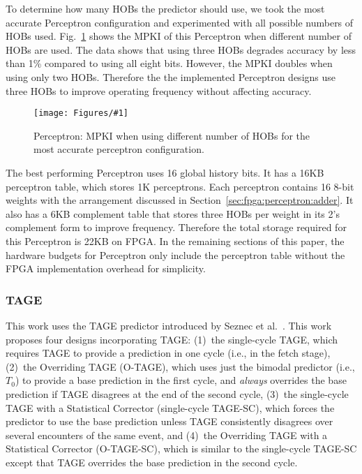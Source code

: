\documentclass[conference]{IEEEtran}
\newcommand{\kfig}[4]{ %
        \begin{figure}[!t]
        \centering
        \texttt{[image: Figures/\#1]}
        \vspace{-1mm}
        \caption{#3}
        \label{#2}
        \end{figure}
}
\begin{document}
To determine how many HOBs the predictor should use, we took the most accurate Perceptron configuration and experimented with all possible numbers of HOBs used. Fig.~\ref{fig:perceptronHOB} shows the MPKI of this Perceptron when different number of HOBs are used. The data shows that using three HOBs degrades accuracy by less than 1\% compared to using all eight bits. However, the MPKI doubles when using only two HOBs. Therefore the the implemented Perceptron designs use three HOBs to improve operating frequency without affecting accuracy.
\kfig{perceptronHOB.pdf}{fig:perceptronHOB}{Perceptron: MPKI when using different number of HOBs for the most accurate perceptron configuration.}{angle = 0, trim = 1in 2.6in 1in 2.6in, clip, width=0.35\textwidth}

The best performing Perceptron uses 16 global history bits. It has a 16KB perceptron table, which stores 1K perceptrons. Each perceptron contains 16 8-bit weights with the arrangement discussed in Section~\ref{sec:fpga:perceptron:adder}. It also has a 6KB complement table that stores three HOBs per weight in its 2's complement form to improve frequency. Therefore the total storage required for this Perceptron is 22KB on FPGA. In the remaining sections of this paper, the hardware budgets for Perceptron only include the perceptron table without the FPGA implementation overhead for simplicity.

\subsubsection{TAGE}
\label{sec:eval:accuracy:tage}
This work uses the TAGE predictor introduced by Seznec et al.~\cite{tage}.  This work proposes four designs incorporating TAGE:  (1)~the single-cycle TAGE, which requires TAGE to provide a prediction in one cycle (i.e., in the fetch stage), (2)~the Overriding TAGE (\mbox{O-TAGE}), which uses just the bimodal predictor (i.e., $T_0$) to provide a base prediction in the first cycle, and \textit{always} overrides the base prediction if TAGE disagrees at the end of the second cycle, (3)~the single-cycle TAGE with a Statistical Corrector (single-cycle \mbox{TAGE-SC}), which forces the predictor to use the base prediction unless TAGE consistently disagrees over several encounters of the same event, and (4)~the Overriding TAGE with a Statistical Corrector (\mbox{O-TAGE-SC}), which is similar to the single-cycle \mbox{TAGE-SC} except that TAGE overrides the base prediction in the second cycle.
\end{document}
